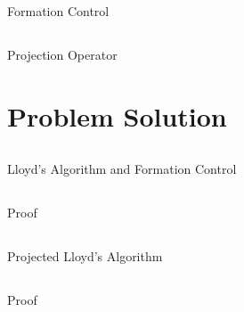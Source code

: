 \documentclass[t]{beamer}
\begin{document}
\subsection[Formation Control]{}
\begin{frame}[label=sl2]{Formation Control}

\end{frame}

\subsection[Projection Operator]{}
\begin{frame}[label=sl2]{Projection Operator}

\end{frame}


\section[Problem Solution]{Problem Solution}
\subsection[Lloyd's Algorithm and Formation Control]{}
\begin{frame}[label=sl3]{Lloyd's Algorithm and Formation Control}

\end{frame}

\subsection[Lloyd's Algorithm and Formation Control]{}
\begin{frame}[label=sl3]{Proof}

\end{frame}

\subsection[Projected Lloyd's Algorithm]{}
\begin{frame}[label=sl3]{Projected Lloyd's Algorithm}

\end{frame}

\subsection[Projected Lloyd's Algorithm]{}
\begin{frame}[label=sl3]{Proof}

\end{frame}
\end{document}
